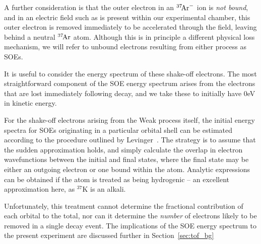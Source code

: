 A further consideration is that the outer electron in an $^{37}\textrm{\!Ar}^{-}$ ion is \emph{not bound},~ and in an electric field such as is present within our experimental chamber, this outer electron is removed immediately to be accelerated through the field, leaving behind a neutral $^{37}\textrm{\!Ar}$ atom.  Although this is in principle a different physical loss mechanism, we will refer to unbound electrons resulting from either process as SOEs.  

It is useful to consider the energy spectrum of these shake-off electrons.  The most straightforward component of the SOE energy spectrum arises from the electrons that are lost immediately following decay, and we take these to initially have 0eV in kinetic energy.  

For the shake-off electrons arising from the Weak process itself, the initial energy spectra for SOEs originating in a particular orbital shell can be estimated according to the procedure outlined by Levinger~\cite{Levinger}.  The strategy is to assume that the sudden approximation holds, and simply calculate the overlap in electron wavefunctions between the initial and final states, where the final state may be either an outgoing electron or one bound within the atom.  Analytic expressions can be obtained if the atom is treated as being hydrogenic -- an excellent approximation here, as $^{37}\textrm{K}$ is an alkali.  

Unfortunately, this treatment cannot determine the fractional contribution of each orbital to the total, nor can it determine the \emph{number} of electrons likely to be removed in a single decay event.  The implications of the SOE energy spectrum to the present experiment are discussed further in Section~\ref{sec:tof_bg} 







